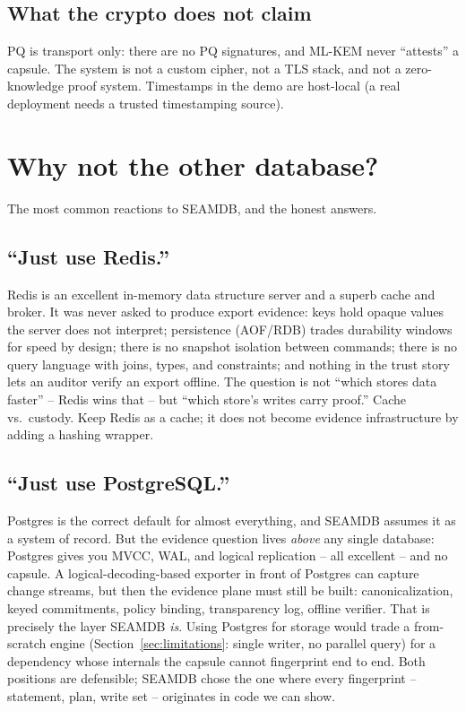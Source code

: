 \documentclass[11pt]{article}
\begin{document}
\subsection{What the crypto does not claim}
PQ is transport only: there are no PQ signatures, and ML-KEM never
``attests'' a capsule. The system is not a custom cipher, not a TLS stack,
and not a zero-knowledge proof system. Timestamps in the demo are host-local
(a real deployment needs a trusted timestamping source).

\section{Why not the other database?}
\label{sec:alternatives}

The most common reactions to SEAMDB, and the honest answers.

\subsection{``Just use Redis.''}
Redis is an excellent in-memory data structure server and a superb cache and
broker. It was never asked to produce export evidence: keys hold opaque
values the server does not interpret; persistence (AOF/RDB) trades durability
windows for speed by design; there is no snapshot isolation between
commands; there is no query language with joins, types, and constraints; and
nothing in the trust story lets an auditor verify an export offline. The
question is not ``which stores data faster'' -- Redis wins that -- but
``which store's writes carry proof.'' Cache vs.\ custody. Keep Redis as a
cache; it does not become evidence infrastructure by adding a hashing
wrapper.

\subsection{``Just use PostgreSQL.''}
Postgres is the correct default for almost everything, and SEAMDB assumes it
as a system of record. But the evidence question lives \emph{above} any
single database: Postgres gives you MVCC, WAL, and logical replication --
all excellent -- and no capsule. A logical-decoding-based exporter in front
of Postgres can capture change streams, but then the evidence plane must
still be built: canonicalization, keyed commitments, policy binding,
transparency log, offline verifier. That is precisely the layer SEAMDB
\emph{is}. Using Postgres for storage would trade a from-scratch engine
(Section~\ref{sec:limitations}: single writer, no parallel query) for a
dependency whose internals the capsule cannot fingerprint end to end. Both
positions are defensible; SEAMDB chose the one where every fingerprint --
statement, plan, write set -- originates in code we can show.
\end{document}
